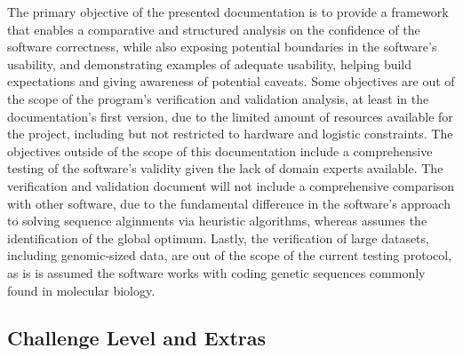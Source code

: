 \documentclass[12pt, titlepage]{article}
\begin{document}
The primary objective of the presented documentation is to provide a framework that 
enables a comparative and structured analysis on the confidence of the \progname{} software 
correctness, while also exposing potential boundaries in the software's usability, and 
demonstrating examples of adequate usability, helping build expectations and giving 
awareness of potential caveats.
Some objectives are out of the scope of the program's verification and validation analysis, at least 
in the documentation's first version, due to the limited amount of resources available for the project, 
including but not restricted to hardware and logistic constraints. The objectives outside of the scope 
of this documentation include a comprehensive testing of the software's validity given the lack of 
domain experts available. The verification and validation document will not include a comprehensive 
comparison with other software, due to the fundamental difference in the software's approach to
solving sequence alginments via heuristic algorithms, whereas \progname{} assumes the identification of the 
global optimum. Lastly, the verification of large datasets, including genomic-sized data, are out of the 
scope of the current testing protocol, as is is assumed the software works with coding genetic sequences 
commonly found in molecular biology.




\subsection{Challenge Level and Extras}
\end{document}
